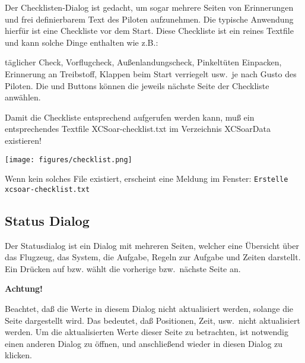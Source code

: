 
Der Checklisten-Dialog ist gedacht, um sogar mehrere Seiten von Erinnerungen und frei definierbarem Text des Piloten aufzunehmen.
Die typische Anwendung hierfür ist eine Checkliste vor dem Start. Diese Checkliste ist ein reines Textfile und kann solche Dinge enthalten wie z.B.:\


täglicher Check, Vorflugcheck, Außenlandungscheck, Pinkeltüten Einpacken, Erinnerung an Treibstoff, Klappen beim Start verriegelt usw.\ je nach Gusto des Piloten.
Die  \button{$<$} und \button{$>$} Buttons können die jeweils nächste Seite der Checkliste anwählen.

Damit die Checkliste entsprechend aufgerufen werden kann, muß ein entsprechendes Textfile \textsf{\textsf{XCSoar}-checklist.txt} im Verzeichnis \textsf{\textsf{XCSoar}Data} existieren!


\begin{center}
\texttt{[image: figures/checklist.png]}
\end{center}

Wenn kein solches File existiert, erscheint eine Meldung im Fenster: \verb|Erstelle xcsoar-checklist.txt|

\subsection*{Status Dialog}


Der Statusdialog ist ein Dialog mit mehreren Seiten, welcher eine Übersicht über das Flugzeug, das System, die Aufgabe, Regeln zur Aufgabe und Zeiten darstellt. Ein Drücken auf \button{$<$} bzw.  \button{$>$} wählt die vorherige bzw.\  nächste Seite an.

\textbf{Achtung!}

Beachtet, daß die Werte in diesem Dialog nicht aktualisiert werden, solange die Seite dargestellt wird.
\warning Das bedeutet, daß Positionen, Zeit, usw.\ nicht aktualisiert werden. Um die aktualisierten Werte dieser Seite zu betrachten, ist notwendig einen anderen Dialog zu öffnen, und anschließend wieder in diesen Dialog zu klicken.

